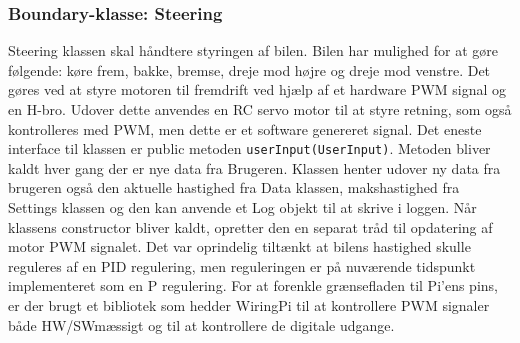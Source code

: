 \subsubsection{Boundary-klasse: Steering} 

Steering klassen skal håndtere styringen af bilen. 
Bilen har mulighed for at gøre følgende: køre frem, bakke, bremse, dreje mod højre og dreje mod venstre.
Det gøres ved at styre motoren til fremdrift ved hjælp af et hardware PWM signal og en H-bro. 
Udover dette anvendes en RC servo motor til at styre retning, som også kontrolleres med PWM, men dette er et software genereret signal. 
Det eneste interface til klassen er public metoden \texttt{userInput(UserInput)}. 
Metoden bliver kaldt hver gang der er nye data fra Brugeren. 
Klassen henter udover ny data fra brugeren også den aktuelle hastighed fra Data klassen, makshastighed fra Settings klassen og den kan anvende et Log objekt til at skrive i loggen.
Når klassens constructor bliver kaldt, opretter den en separat tråd til opdatering af motor PWM signalet. 
Det var oprindelig tiltænkt at bilens hastighed skulle reguleres af en PID regulering, men reguleringen er på nuværende tidspunkt implementeret som en P regulering.
For at forenkle grænsefladen til Pi'ens pins, er der brugt et bibliotek som hedder WiringPi \cite{lib:wiringpi} til at kontrollere PWM signaler både HW/SWmæssigt og til at kontrollere de digitale udgange. 